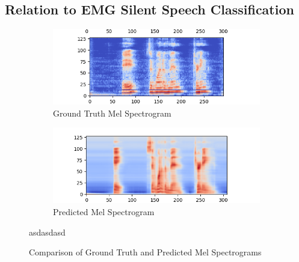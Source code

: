 \subsection{Relation to EMG Silent Speech Classification}

\begin{figure}
  \centering
  \begin{subfigure}{.5\textwidth}
    \centering
    \includegraphics[width=1\linewidth]{graphics/mel_vs_pred/458_g.png}
    \caption{Ground Truth Mel Spectrogram}
    \label{fig:sub1}
  \end{subfigure}%
  \begin{subfigure}{.5\textwidth}
    \centering
    \includegraphics[width=1\linewidth]{graphics/mel_vs_pred/458_p.png}
    \caption{Predicted Mel Spectrogram}
    \label{fig:sub2}
  \end{subfigure}
  \caption{Comparison of Ground Truth and Predicted Mel Spectrograms}
  asdasdasd\\
\end{figure}

